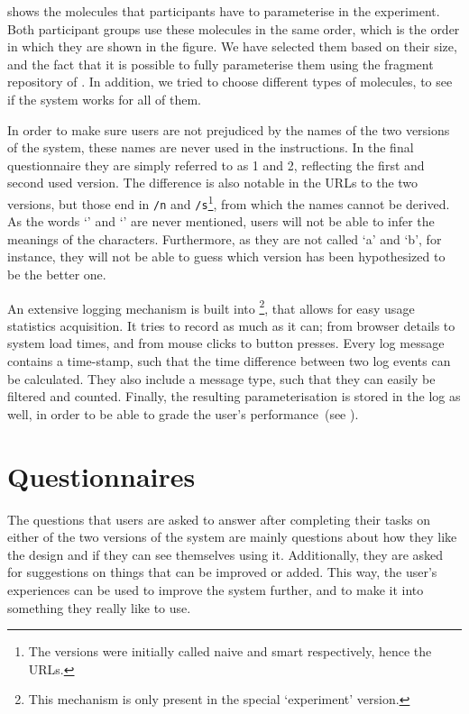  shows the molecules that participants have to parameterise in the experiment. Both participant groups use these molecules in the same order, which is the order in which they are shown in the figure. We have selected them based on their size, and the fact that it is possible to fully parameterise them using the fragment repository of \oframp. In addition, we tried to choose different types of molecules, to see if the system works for all of them.

In order to make sure users are not prejudiced by the names of the two versions of the system, these names are never used in the instructions. In the final questionnaire they are simply referred to as 1 and 2, reflecting the first and second used version. The difference is also notable in the URLs to the two versions, but those end in \verb|/n| and \verb|/s|\footnote{The versions were initially called naive and smart respectively, hence the URLs.}, from which the names cannot be derived. As the words `\IDa' and `\IDb' are never mentioned, users will not be able to infer the meanings of the characters. Furthermore, as they are not called `a' and `b', for instance, they will not be able to guess which version has been hypothesized to be the better one.

An extensive logging mechanism is built into \oframp\footnote{This mechanism is only present in the special `experiment' version.}, that allows for easy usage statistics acquisition. It tries to record as much as it can; from browser details to system load times, and from mouse clicks to button presses. Every log message contains a time-stamp, such that the time difference between two log events can be calculated. They also include a message type, such that they can easily be filtered and counted. Finally, the resulting parameterisation is stored in the log as well, in order to be able to grade the user's performance~(see ).



\section{Questionnaires}
The questions that users are asked to answer after completing their tasks on either of the two versions of the system are mainly questions about how they like the design and if they can see themselves using it. Additionally, they are asked for suggestions on things that can be improved or added. This way, the user's experiences can be used to improve the system further, and to make it into something they really like to use.


